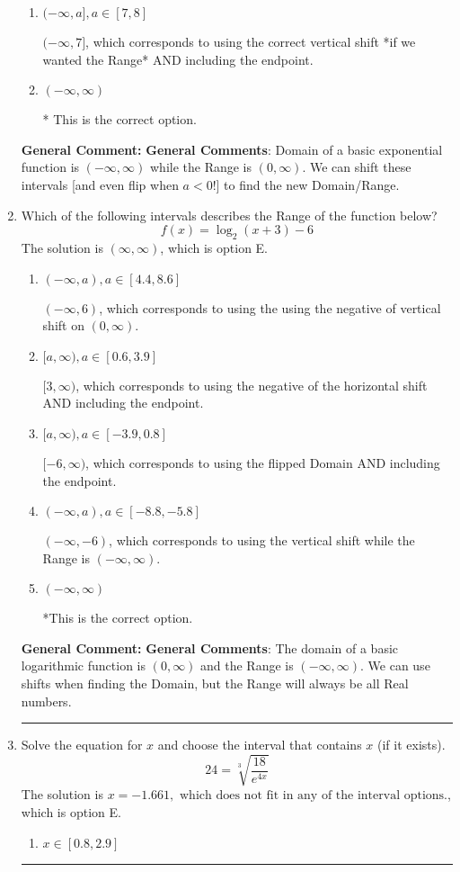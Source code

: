 \documentclass{extbook}[14pt]
\newcommand{\litem}[1]{\item #1

\rule{\textwidth}{0.4pt}}
\begin{document}
\begin{enumerate}
{\begin{enumerate}[label=\Alph*.]
$(-7, \infty)$, which corresponds to using the negative vertical shift AND flipping the Range interval.
\item \( (-\infty, a], a \in [7, 8] \)

$(-\infty, 7]$, which corresponds to using the correct vertical shift *if we wanted the Range* AND including the endpoint.
\item \( (-\infty, \infty) \)

* This is the correct option.
\end{enumerate}

\textbf{General Comment:} \textbf{General Comments}: Domain of a basic exponential function is $(-\infty, \infty)$ while the Range is $(0, \infty)$. We can shift these intervals [and even flip when $a<0$!] to find the new Domain/Range.
}
\litem{
Which of the following intervals describes the Range of the function below?
\[ f(x) = \log_2{(x+3)}-6 \]The solution is \( (\infty, \infty) \), which is option E.\begin{enumerate}[label=\Alph*.]
\item \( (-\infty, a), a \in [4.4, 8.6] \)

$(-\infty, 6)$, which corresponds to using the using the negative of vertical shift on $(0, \infty)$.
\item \( [a, \infty), a \in [0.6, 3.9] \)

$[3, \infty)$, which corresponds to using the negative of the horizontal shift AND including the endpoint.
\item \( [a, \infty), a \in [-3.9, 0.8] \)

$[-6, \infty)$, which corresponds to using the flipped Domain AND including the endpoint.
\item \( (-\infty, a), a \in [-8.8, -5.8] \)

$(-\infty, -6)$, which corresponds to using the vertical shift while the Range is $(-\infty, \infty)$.
\item \( (-\infty, \infty) \)

*This is the correct option.
\end{enumerate}

\textbf{General Comment:} \textbf{General Comments}: The domain of a basic logarithmic function is $(0, \infty)$ and the Range is $(-\infty, \infty)$. We can use shifts when finding the Domain, but the Range will always be all Real numbers.
}
\litem{
 Solve the equation for $x$ and choose the interval that contains $x$ (if it exists).
\[  24 = \sqrt[3]{\frac{18}{e^{4x}}} \]The solution is \( x = -1.661, \text{ which does not fit in any of the interval options.} \), which is option E.\begin{enumerate}[label=\Alph*.]
\item \( x \in [0.8, 2.9] \)


\end{enumerate}}
\end{enumerate}
\end{document}
